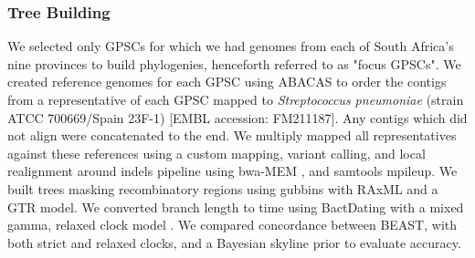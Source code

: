 \documentclass{article}
\begin{document}
\subsubsection{Tree Building}
We selected only GPSCs for which we had genomes from each of South Africa's nine provinces to build phylogenies, henceforth referred to as "focus GPSCs". We created reference genomes for each GPSC using ABACAS to order the contigs from a representative of each GPSC mapped to \textit{Streptococcus pneumoniae }(strain ATCC 700669/Spain 23F-1) [EMBL accession: FM211187]\cite{assefaABACASAlgorithmbasedAutomatic2009}. Any contigs which did not align were concatenated to the end.  We multiply mapped all representatives against these references using a custom mapping, variant calling, and local realignment around indels pipeline using bwa-MEM \cite{liFastAccurateShort2009}, and samtools mpileup\cite{liFastAccurateShort2009}. We built trees masking recombinatory regions using gubbins\cite{croucherRapidPhylogeneticAnalysis2015} with RAxML and a GTR model. We converted branch length to time using BactDating with a mixed gamma, relaxed clock model \cite{didelotBayesianInferenceAncestral2018}. We compared concordance between BEAST, with both strict and relaxed clocks, and a Bayesian skyline prior to evaluate accuracy.
\end{document}
